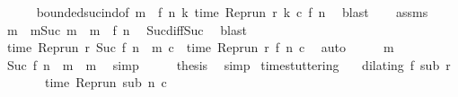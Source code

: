 \begin{isabellebody}
\ \ \ \ \isamarkupfalse%
\ bounded{\isacharunderscore}suc{\isacharunderscore}ind{\isacharbrackleft}of\ {\isacartoucheopen}m\ {\isacharminus}\ {\isacharparenleft}f\ n{\isacharparenright}{\isacartoucheclose}\ {\isacartoucheopen}{\isasymlambda}k{\isachardot}\ time\ {\isacharparenleft}Rep{\isacharunderscore}run\ r\ k\ c{\isacharparenright}{\isacartoucheclose}\ {\isacartoucheopen}f\ n{\isacartoucheclose}{\isacharbrackright}\ \isamarkupfalse%
\ blast\isanewline
\ \ \isamarkupfalse%
\ assms{\isacharparenleft}{}{\isacharparenright}\ \isamarkupfalse%
\ m\ \ m{}{\isacharcolon}{\isacartoucheopen}Suc\ m\ {\isacharequal}\ m\ {\isacharminus}\ {\isacharparenleft}f\ n{\isacharparenright}{\isacartoucheclose}\ \isamarkupfalse%
\ Suc{\isacharunderscore}diff{\isacharunderscore}Suc\ \isamarkupfalse%
\ blast\isanewline
\ \ \isamarkupfalse%
\ {\isacharasterisk}\ \isamarkupfalse%
\ {\isacartoucheopen}time\ {\isacharparenleft}{\isacharparenleft}Rep{\isacharunderscore}run\ r{\isacharparenright}\ {\isacharparenleft}Suc\ {\isacharparenleft}{\isacharparenleft}f\ n{\isacharparenright}\ {\isacharplus}\ m\ c{\isacharparenright}\ {\isacharequal}\ time\ {\isacharparenleft}{\isacharparenleft}Rep{\isacharunderscore}run\ r{\isacharparenright}\ {\isacharparenleft}f\ n{\isacharparenright}\ c{\isacharparenright}{\isacartoucheclose}\ \isamarkupfalse%
\ auto\isanewline
\ \ \isamarkupfalse%
\ \isamarkupfalse%
\ m{}\ \isamarkupfalse%
\ {\isacartoucheopen}Suc\ {\isacharparenleft}{\isacharparenleft}f\ n{\isacharparenright}\ {\isacharplus}\ m\ {\isacharequal}\ m{\isacartoucheclose}\ \isamarkupfalse%
\ simp\isanewline
\ \ \isamarkupfalse%
\ \isamarkupfalse%
\ {\isacharquery}thesis\ \isamarkupfalse%
\ simp\isanewline
{}\isamarkupfalse%
%
\endisatagproof
{\isafoldproof}%
%
\isadelimproof
\isanewline
%
\endisadelimproof
\isanewline
{}\isamarkupfalse%
\ time{\isacharunderscore}stuttering{\isacharcolon}\isanewline
\ \ \ {\isacartoucheopen}dilating\ f\ sub\ r{\isacartoucheclose}\isanewline
\ \ \ \ \ \ \ {\isacartoucheopen}time\ {\isacharparenleft}{\isacharparenleft}Rep{\isacharunderscore}run\ sub{\isacharparenright}\ n\ c{\isacharparenright}\ {\isacharequal}\ {\isasymtau}{\isacartoucheclose}\isanewline

\end{isabellebody}
